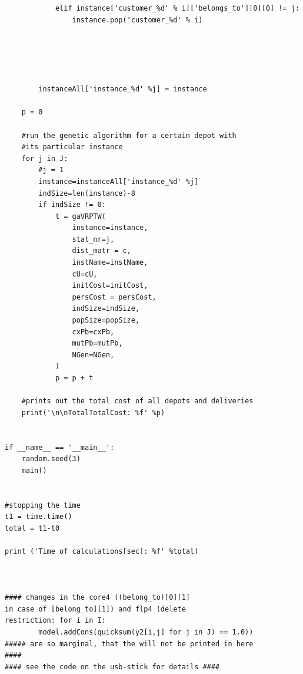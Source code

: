 \documentclass[a4paper,12pt,parskip,bibtotoc,liststotoc]{article}
\begin{document}
\begin{appendix}
\begin{lstlisting}
            elif instance['customer_%d' % i]['belongs_to'][0][0] != j:
                instance.pop('customer_%d' % i)
            
    
    
        
    
        instanceAll['instance_%d' %j] = instance
        
    p = 0
  
    #run the genetic algorithm for a certain depot with
    #its particular instance 
    for j in J:
        #j = 1
        instance=instanceAll['instance_%d' %j]
        indSize=len(instance)-8
        if indSize != 0:
            t = gaVRPTW(
                instance=instance,
                stat_nr=j,
                dist_matr = c,
                instName=instName,
                cU=cU,
                initCost=initCost,
                persCost = persCost,
                indSize=indSize,
                popSize=popSize,
                cxPb=cxPb,
                mutPb=mutPb,
                NGen=NGen,
            )
            p = p + t 
            
    #prints out the total cost of all depots and deliveries
    print('\n\nTotalTotalCost: %f' %p)


if __name__ == '__main__':
    random.seed(3)
    main()


#stopping the time
t1 = time.time()
total = t1-t0

print ('Time of calculations[sec]: %f' %total)



#### changes in the core4 ((belong_to)[0][1]
in case of [belong_to][1]) and flp4 (delete 
restriction: for i in I:
        model.addCons(quicksum(y2[i,j] for j in J) == 1.0))
##### are so marginal, that the will not be printed in here
####
#### see the code on the usb-stick for details ####




\end{lstlisting}

\end{appendix}
%
%
\end{document}
